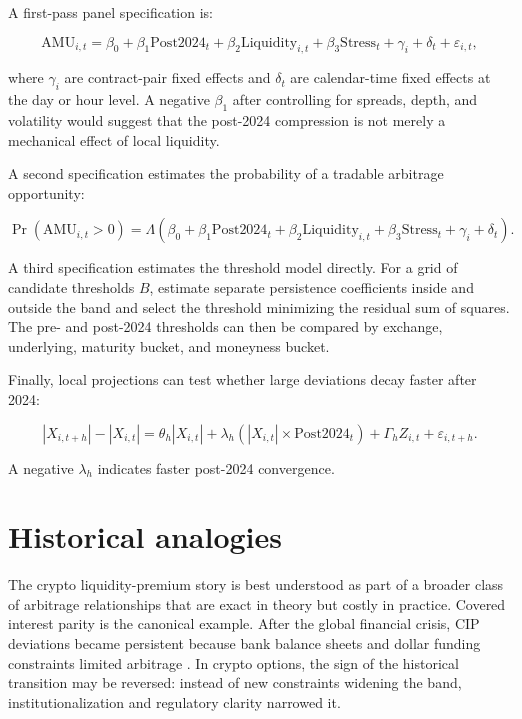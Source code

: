 \documentclass[12pt]{article}
\begin{document}
A first-pass panel specification is:

\begin{equation}
\mathrm{AMU}_{i,t}=\beta_0+\beta_1\mathrm{Post2024}_t+\beta_2\mathrm{Liquidity}_{i,t}+\beta_3\mathrm{Stress}_t+\gamma_i+\delta_t+\varepsilon_{i,t},
\end{equation}

where $\gamma_i$ are contract-pair fixed effects and $\delta_t$ are calendar-time fixed effects at the day or hour level. A negative $\beta_1$ after controlling for spreads, depth, and volatility would suggest that the post-2024 compression is not merely a mechanical effect of local liquidity.

A second specification estimates the probability of a tradable arbitrage opportunity:

\begin{equation}
\Pr(\mathrm{AMU}_{i,t}>0)=\Lambda\left(\beta_0+\beta_1\mathrm{Post2024}_t+\beta_2\mathrm{Liquidity}_{i,t}+\beta_3\mathrm{Stress}_t+\gamma_i+\delta_t\right).
\end{equation}

A third specification estimates the threshold model directly. For a grid of candidate thresholds $B$, estimate separate persistence coefficients inside and outside the band and select the threshold minimizing the residual sum of squares. The pre- and post-2024 thresholds can then be compared by exchange, underlying, maturity bucket, and moneyness bucket.

Finally, local projections can test whether large deviations decay faster after 2024:

\begin{equation}
|X_{i,t+h}|-|X_{i,t}|=\theta_h |X_{i,t}|+\lambda_h \left(|X_{i,t}|\times \mathrm{Post2024}_t\right)+\Gamma_h Z_{i,t}+\varepsilon_{i,t+h}.
\end{equation}

A negative $\lambda_h$ indicates faster post-2024 convergence.

\section{Historical analogies}

The crypto liquidity-premium story is best understood as part of a broader class of arbitrage relationships that are exact in theory but costly in practice. Covered interest parity is the canonical example. After the global financial crisis, CIP deviations became persistent because bank balance sheets and dollar funding constraints limited arbitrage \citep{du2018deviations}. In crypto options, the sign of the historical transition may be reversed: instead of new constraints widening the band, institutionalization and regulatory clarity narrowed it.
\end{document}
